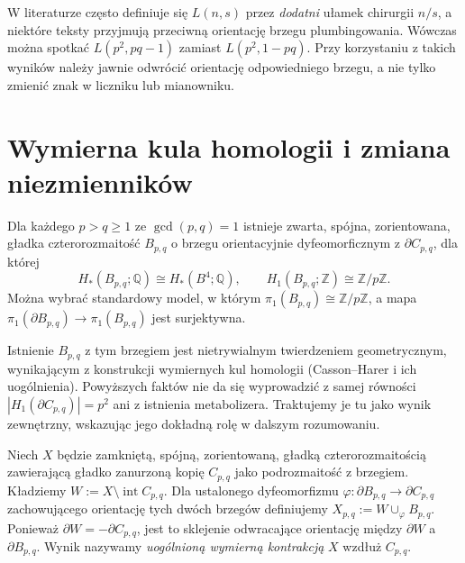 \begin{uwaga}
W literaturze często definiuje się $L(n,s)$ przez
\emph{dodatni} ułamek chirurgii $n/s$, a niektóre teksty
przyjmują przeciwną orientację brzegu plumbingowania.
Wówczas można spotkać $L(p^2,pq-1)$ zamiast
$L(p^2,1-pq)$. Przy korzystaniu z takich wyników
należy jawnie odwrócić orientację odpowiedniego brzegu,
a nie tylko zmienić znak w liczniku lub mianowniku.
\end{uwaga}

\section{Wymierna kula homologii i zmiana niezmienników}
\label{sec:tg-general-operation}

\begin{twierdzenie}
\label{thm:tg-general-ball}
Dla każdego $p>q\geq1$ ze $\gcd(p,q)=1$ istnieje
zwarta, spójna, zorientowana, gładka czterorozmaitość
$B_{p,q}$ o brzegu orientacyjnie dyfeomorficznym z
$\partial C_{p,q}$, dla której
\[
H_*(B_{p,q};\mathbb Q)\cong H_*(B^4;\mathbb Q),
\qquad H_1(B_{p,q};\mathbb Z)\cong\mathbb Z/p\mathbb Z.
\]
Można wybrać standardowy model, w którym
$\pi_1(B_{p,q})\cong\mathbb Z/p\mathbb Z$, a mapa
$\pi_1(\partial B_{p,q})\to\pi_1(B_{p,q})$ jest surjektywna.
\end{twierdzenie}

\begin{uwaga}
Istnienie $B_{p,q}$ z tym brzegiem jest nietrywialnym
twierdzeniem geometrycznym, wynikającym z konstrukcji
wymiernych kul homologii (Casson--Harer i ich uogólnienia).
Powyższych faktów nie da się wyprowadzić z samej równości
$|H_1(\partial C_{p,q})|=p^2$ ani z istnienia metabolizera.
Traktujemy je tu jako wynik zewnętrzny, wskazując jego dokładną
rolę w dalszym rozumowaniu.
\end{uwaga}

\begin{definicja}
Niech $X$ będzie zamkniętą, spójną, zorientowaną,
gładką czterorozmaitością zawierającą gładko zanurzoną
kopię $C_{p,q}$ jako podrozmaitość z brzegiem.
Kładziemy $W:=X\setminus\operatorname{int}C_{p,q}$.
Dla ustalonego dyfeomorfizmu
$\varphi:\partial B_{p,q}\to\partial C_{p,q}$ zachowującego
orientację tych dwóch brzegów definiujemy
$X_{p,q}:=W\cup_{\varphi}B_{p,q}$.
Ponieważ $\partial W=-\partial C_{p,q}$, jest to
sklejenie odwracające orientację między $\partial W$
a $\partial B_{p,q}$. Wynik nazywamy
\emph{uogólnioną wymierną kontrakcją} $X$ wzdłuż $C_{p,q}$.
\end{definicja}

